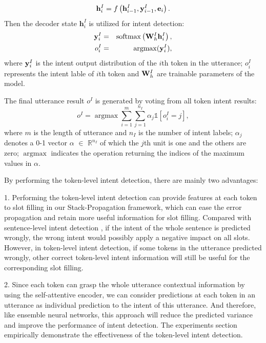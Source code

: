 \documentclass[11pt,a4paper]{article}
\begin{document}
\begin{equation}
{\bf{h}}_ { i }^{I} = f \left( {\bf{h}} _ { i - 1 }^{I} , {\bf{y}} _ { i - 1 }^{I} , {\bf{e}} _ { i }  \right).
\end{equation}
Then the decoder state $\mathbf{h}_{i}^
{I}$ is utilized for intent detection:
\begin{eqnarray}
{\bf{y}} _ { i } ^ { I } &=& \operatorname { softmax } \left( {\bf{W}} _ { h } ^ { I }{\bf{h}} _ { i }^{I} \right), \\
{o} _ { i } ^ { I } &=& \operatorname { argmax } ({\bf{y}} _ { i } ^ { I }),
\end{eqnarray}
where ${\bf{y}} _ { i } ^ { I }$ is the intent output distribution of the $i$th token in the utterance; ${{o}_{i}^{I}} $ represents the intent lable of $i$th token and ${\bf{W}}_{h}^{I}$ are trainable parameters of the model.

The final utterance result ${o}^{I}$ is generated by 
voting from all token intent results:
\begin{equation}
{{o}^{I}} =   \operatorname {argmax} {\sum _ { i = 1 } ^ {m } \sum _ { j = 1 } ^ { n_{I} } \alpha _ { j }  \mathds{1}[{{o}_{i}^{I}} = j] } ,
\end{equation}
where $m$ is the length of utterance and $n_{I}$ is the number of 
intent labels; $\alpha_{j}$ denotes a  0-1 vector  
$\alpha$  $\in$  $\mathbb{R}^{n_{I}}$ of which the $j$th unit is one and the 
others are zero;  $\operatorname {argmax}$ indicates the operation  returning 
the indices of the maximum values in $\alpha$.

By performing the token-level intent detection, there are mainly two advantages: 

1. Performing the token-level intent detection can provide features at each token to slot filling in our Stack-Propagation framework, which can ease the error propagation and retain more useful information for slot filling. Compared with sentence-level intent detection \cite{li2018self},
if the intent of the whole sentence is predicted wrongly, the wrong intent would possibly apply a negative impact on all slots. However, in token-level intent detection, if some tokens in the utterance predicted wrongly, other correct token-level intent information will still be useful for the corresponding slot filling.

2. Since each token can grasp the whole utterance contextual information by using the self-attentive encoder, 
we can consider predictions at each token in an utterance as individual prediction to the intent of this utterance.
And therefore, like ensemble neural networks, this approach will reduce the 
predicted variance and improve the performance of intent detection.
The experiments section empirically demonstrate the effectiveness of the token-level intent detection.
\end{document}
